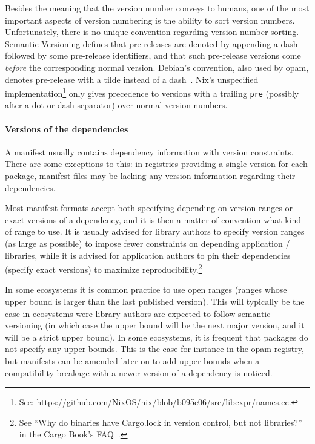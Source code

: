 Besides the meaning that the version number conveys to humans, one of the most important aspects of version numbering is the ability to sort version numbers.
Unfortunately, there is no unique convention regarding version number sorting.
Semantic Versioning defines that pre-releases are denoted by appending a dash followed by some pre-release identifiers, and that such pre-release versions come \emph{before} the corresponding normal version.
Debian's convention, also used by opam, denotes pre-release with a tilde instead of a dash~\cite[Section 5.6.12]{debian_policy_manual}.
Nix's unspecified implementation\footnote{
	See: \url{https://github.com/NixOS/nix/blob/b095c06/src/libexpr/names.cc}.
} only gives precedence to versions with a trailing \verb|pre| (possibly after a dot or dash separator) over normal version numbers.

\paragraph{Versions of the dependencies}

A manifest usually contains dependency information with version constraints.
There are some exceptions to this: in registries providing a single version for each package, manifest files may be lacking any version information regarding their dependencies.

Most manifest formats accept both specifying depending on version ranges or exact versions of a dependency, and it is then a matter of convention what kind of range to use.
It is usually advised for library authors to specify version ranges (as large as possible) to impose fewer constraints on depending application / libraries, while it is advised for application authors to pin their dependencies (specify exact versions) to maximize reproducibility.\footnote{
	See ``Why do binaries have Cargo.lock in version control, but not libraries?'' in the Cargo Book's FAQ~\cite[Chapter 5]{cargo_book}.
}

In some ecosystems it is common practice to use open ranges (ranges whose upper bound is larger than the last published version).
This will typically be the case in ecosystems were library authors are expected to follow semantic versioning (in which case the upper bound will be the next major version, and it will be a strict upper bound).
In some ecosystems, it is frequent that packages do not specify any upper bounds.
This is the case for instance in the opam registry, but manifests can be amended later on to add upper-bounds when a compatibility breakage with a newer version of a dependency is noticed.

